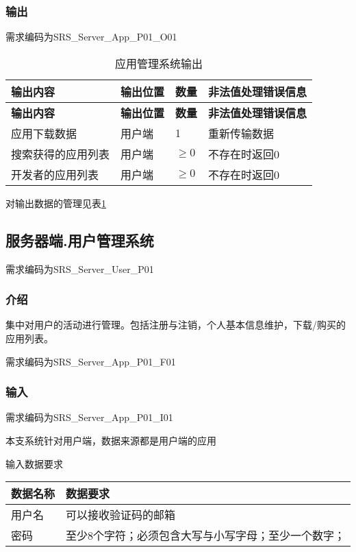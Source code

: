\subsubsection{输出}

需求编码为SRS\_Server\_App\_P01\_O01

\begin{longtable}{|p{3cm}|p{4cm}|p{1cm}|p{6cm}|}
\caption{应用管理系统输出}\label{tab:concrete_app_sys_output} \\
\hline
\textbf{输出内容} & \textbf{输出位置} & \textbf{数量}  & \textbf{非法值处理错误信息}    \\
\hline
\endfirsthead
\hline
\textbf{输出内容} & \textbf{输出位置} & \textbf{数量}  & \textbf{非法值处理错误信息}  \\
\hline
\endhead
\hline 
\endfoot
\hline
\endlastfoot
应用下载数据 & 用户端 & 1 & 重新传输数据\\
搜索获得的应用列表 & 用户端 & $\ge 0$ & 不存在时返回0\\
开发者的应用列表 & 用户端 & $\ge 0$ & 不存在时返回0\\
\end{longtable}
	
对输出数据的管理见表\ref{tab:concrete_app_sys_output}


\subsection{服务器端.用户管理系统}
需求编码为SRS\_Server\_User\_P01
\subsubsection{介绍}
集中对用户的活动进行管理。包括注册与注销，个人基本信息维护，下载/购买的应用列表。

需求编码为SRS\_Server\_App\_P01\_F01
\subsubsection{输入}

需求编码为SRS\_Server\_App\_P01\_I01

本支系统针对用户端，数据来源都是用户端的应用

输入数据要求

\begin{longtable}[]{@{}ll@{}}
\toprule
数据名称 & 数据要求\tabularnewline
\midrule
\endhead
用户名 & 可以接收验证码的邮箱\tabularnewline
密码 &
至少8个字符；必须包含大写与小写字母；至少一个数字；\tabularnewline
\bottomrule
\end{longtable}

